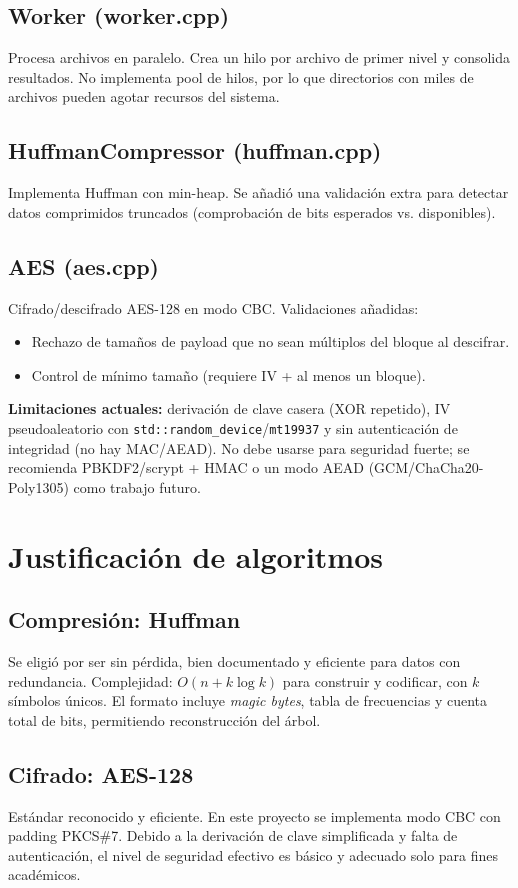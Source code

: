 \documentclass[12pt,a4paper]{article}
\begin{document}
\subsection{Worker (worker.cpp)}
Procesa archivos en paralelo. Crea un hilo por archivo de primer nivel y consolida resultados. No implementa pool de hilos, por lo que directorios con miles de archivos pueden agotar recursos del sistema.

\subsection{HuffmanCompressor (huffman.cpp)}
Implementa Huffman con min-heap. Se añadió una validación extra para detectar datos comprimidos truncados (comprobación de bits esperados vs. disponibles).

\subsection{AES (aes.cpp)}
Cifrado/descifrado AES-128 en modo CBC. Validaciones añadidas:
\begin{itemize}
    \item Rechazo de tamaños de payload que no sean múltiplos del bloque al descifrar.
    \item Control de mínimo tamaño (requiere IV + al menos un bloque).
\end{itemize}
\textbf{Limitaciones actuales:} derivación de clave casera (XOR repetido), IV pseudoaleatorio con \texttt{std::random\_device}/\texttt{mt19937} y sin autenticación de integridad (no hay MAC/AEAD). No debe usarse para seguridad fuerte; se recomienda PBKDF2/scrypt + HMAC o un modo AEAD (GCM/ChaCha20-Poly1305) como trabajo futuro.

\section{Justificación de algoritmos}

\subsection{Compresión: Huffman}
Se eligió por ser sin pérdida, bien documentado y eficiente para datos con redundancia. Complejidad: $O(n + k \log k)$ para construir y codificar, con $k$ símbolos únicos. El formato incluye \textit{magic bytes}, tabla de frecuencias y cuenta total de bits, permitiendo reconstrucción del árbol.

\subsection{Cifrado: AES-128}
Estándar reconocido y eficiente. En este proyecto se implementa modo CBC con padding PKCS\#7. Debido a la derivación de clave simplificada y falta de autenticación, el nivel de seguridad efectivo es básico y adecuado solo para fines académicos.
\end{document}
